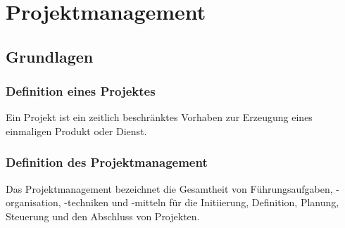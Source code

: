 \section{Projektmanagement}
\subsection{Grundlagen}

\subsubsection{Definition eines Projektes}
Ein Projekt ist ein zeitlich beschränktes Vorhaben zur Erzeugung eines einmaligen Produkt oder Dienst. 

\subsubsection{Definition des Projektmanagement}
Das Projektmanagement bezeichnet die Gesamtheit von Führungsaufgaben, -organisation, -techniken und -mitteln für die Initiierung, Definition, Planung, Steuerung und den Abschluss von Projekten. 


